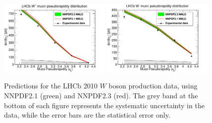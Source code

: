 \begin{figure}[h!]
\centering
\includegraphics[width=0.48\textwidth]{6-LHCimpact/figs/LHCBWZ36PB_0.pdf}
\includegraphics[width=0.48\textwidth]{6-LHCimpact/figs/LHCBWZ36PB_1.pdf}
\caption[Predictions for the LHCb 2010 $W$ boson production data, using NNPDF2.1 and NNPDF2.3]{Predictions for the LHCb 2010 $W$ boson production data, using NNPDF2.1 (green) and NNPDF2.3 (red). The grey band at the bottom of each figure represents the systematic uncertainty in the data, while the error bars are the statistical error only.}
\label{fig:LHCbWpred}
\end{figure}



